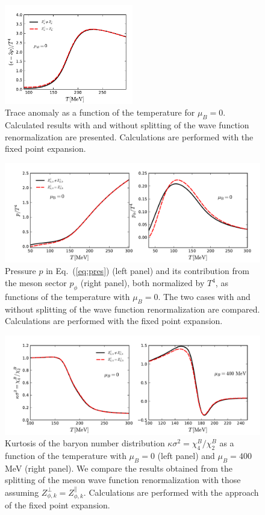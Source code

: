 \documentclass[%
reprint,
superscriptaddress,
showpacs,preprintnumbers,
 amsmath,amssymb,
 aps,
prd,
]{revtex4-1}
\def\Eq#1{Eq.~(\ref{#1})}
\begin{document}
%
\begin{figure}[t]
\includegraphics[width=0.5\textwidth]{trace}
\caption{Trace anomaly as a function of the temperature for $\mu_B=0$. Calculated results with and without splitting of the wave function renormalization are presented. Calculations are performed with the fixed point expansion.}\label{fig:trace}
\end{figure}
%

%
\begin{figure}[t]
\includegraphics[width=1\textwidth]{pres}
\caption{Pressure $p$ in \Eq{eq:pres} (left panel) and its contribution from the meson sector $p_\phi$ (right panel), both normalized by $T^4$, as functions of the temperature with $\mu_B=0$. The two cases with and without splitting of the wave function renormalization are compared. Calculations are performed with the fixed point expansion.}\label{fig:pres}
\end{figure}
%

%
\begin{figure}[t]
\includegraphics[width=1\textwidth]{kurtosis}
\caption{Kurtosis of the baryon number distribution $\kappa \sigma^2=\chi_4^{B}/\chi_2^{B}$ as a function of the temperature with $\mu_B=0$ (left panel) and $\mu_B=400$ MeV (right panel).  We compare the results obtained from the splitting of the meson wave function renormalization with those assuming $Z_{\phi,k}^{\perp}=Z_{\phi,k}^{\parallel}$. Calculations are performed with the approach of the fixed point expansion.}\label{fig:kurtosis}
\end{figure}
%
\end{document}
